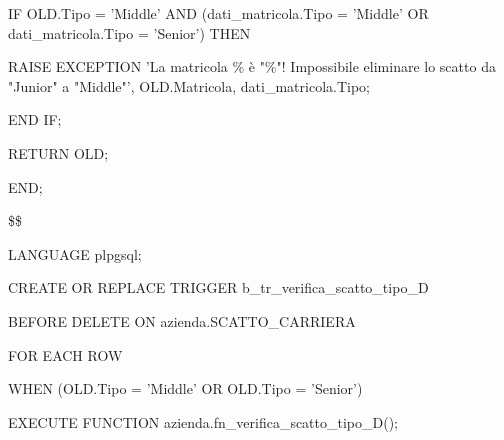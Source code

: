 \begin{flushleft}
\begin{description}
\begin{description}
                        \vspace{0.5cm}

                        \item IF OLD.Tipo = 'Middle' AND (dati\_matricola.Tipo = 'Middle' OR dati\_matricola.Tipo = 'Senior') THEN
                        \begin{description}
                            \item RAISE EXCEPTION 'La matricola \% è "\%"! Impossibile eliminare lo scatto da "Junior" a "Middle"', OLD.Matricola, dati\_matricola.Tipo;
                        \end{description}
                        \item END IF;

                        \item RETURN OLD;
                    \end{description}
                    \item END;
                    \item \$\$
                    \item LANGUAGE plpgsql;
                \end{description}
            \end{flushleft}
        \normalfont

        \ttfamily
            \begin{flushleft}
                \begin{description}
                    \item CREATE OR REPLACE TRIGGER b\_tr\_verifica\_scatto\_tipo\_D
                    \item BEFORE DELETE ON azienda.SCATTO\_CARRIERA
                    \item FOR EACH ROW
                    \item WHEN (OLD.Tipo = 'Middle' OR OLD.Tipo = 'Senior')
                    \item EXECUTE FUNCTION azienda.fn\_verifica\_scatto\_tipo\_D();
                \end{description}
            \end{flushleft}
        \normalfont

\newpage

